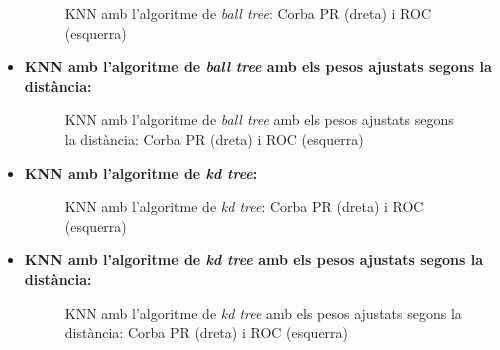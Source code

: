 \documentclass[a4paper, 11pt]{article}
\begin{document}
\begin{itemize}
                \begin{figure}[H]%
                \centering
                \qquad
                \caption*{KNN amb l'algoritme de \textit{ball tree}: Corba PR (dreta) i ROC (esquerra)}
                \end{figure}


            \item \textbf{KNN amb l'algoritme de \textit{ball tree} amb els pesos ajustats segons la distància:}


                \begin{figure}[H]%
                \centering
                \qquad
                \caption*{KNN amb l'algoritme de \textit{ball tree} amb els pesos ajustats segons la distància: Corba PR (dreta) i ROC (esquerra)}
                \end{figure}


            \item \textbf{KNN amb l'algoritme de \textit{kd tree}:}


                \begin{figure}[H]%
                \centering
                \qquad
                \caption*{KNN amb l'algoritme de \textit{kd tree}: Corba PR (dreta) i ROC (esquerra)}
                \end{figure}

            \newpage
            \item \textbf{KNN amb l'algoritme de \textit{kd tree} amb els pesos ajustats segons la distància:}


                \begin{figure}[H]%
                \centering
                \qquad
                \caption*{KNN amb l'algoritme de \textit{kd tree} amb els pesos ajustats segons la distància: Corba PR (dreta) i ROC (esquerra)}
                \end{figure}



\end{itemize}
\end{document}
